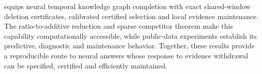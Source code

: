 \StableKG{} equips neural temporal knowledge graph completion with exact shared-window deletion certificates, calibrated certified selection and local evidence maintenance. The ratio-to-additive reduction and sparse competitor theorem make this capability computationally accessible, while public-data experiments establish its predictive, diagnostic and maintenance behavior. Together, these results provide a reproducible route to neural answers whose response to evidence withdrawal can be specified, certified and efficiently maintained.

